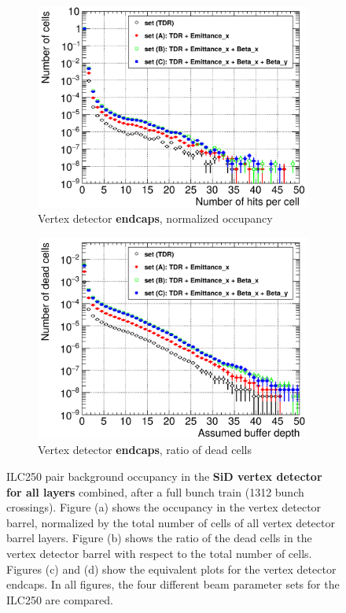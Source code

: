 \begin{figure}
  \begin{subfigure}[b]{0.49\textwidth}
   \centering
    \includegraphics[width=\textwidth]{Figures/Pairs/Occupancy_Comparison_All_layers_wrt_cells_ILC250_ALL_SETS_5T_w_antiDiD_SiVertexEndcap.png}
   \caption{Vertex detector \textbf{endcaps}, normalized occupancy}
   \end{subfigure}
   \hfill
    \begin{subfigure}[b]{0.49\textwidth}
   \centering
    \includegraphics[width=\textwidth]{Figures/Pairs/Occupancy_Comparison_All_layers_deadcells_ILC250_ALL_SETS_5T_w_antiDiD_SiVertexEndcap.png}
   \caption{Vertex detector \textbf{endcaps}, ratio of dead cells}
   \end{subfigure}
   \caption[Pair background occupancy in the SiD vertex detector for the ILC250]{ILC250 pair background occupancy in the \textbf{SiD vertex detector for all layers} combined, after a full bunch train (1312 bunch crossings).
   Figure (a) shows the occupancy in the vertex detector barrel, normalized by the total number of cells of all vertex detector barrel layers.
   Figure (b) shows the ratio of the dead cells in the vertex detector barrel with respect to the total number of cells.
   Figures (c) and (d) show the equivalent plots for the vertex detector endcaps.
   In all figures, the four different beam parameter sets for the ILC250 are compared.
   }
   \label{fig:PairBkg:ILC250_Occupancy}
 \end{figure}
